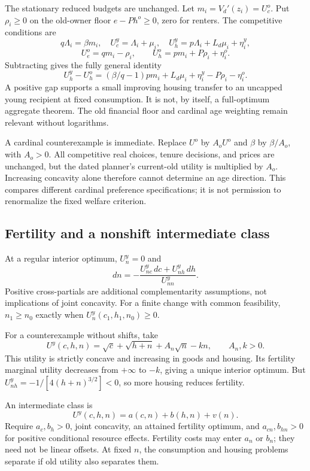 \documentclass[11pt]{article}
\begin{document}
The stationary reduced budgets are unchanged. Let $m_i=V_d'(z_i)=U_c^o$. Put $\rho_i\ge0$ on the old-owner floor $e-Ph^o\ge0$, zero for renters. The competitive conditions are
\[
 q\Lambda_i=\beta m_i,\quad U_c^y=\Lambda_i+\mu_i,\quad
 U_h^y=p\Lambda_i+L_d\mu_i+\eta_i^y,
\]
\[
 U_e^o=qm_i-\rho_i,\qquad U_h^o=pm_i+P\rho_i+\eta_i^o.
\]
Subtracting gives the fully general identity
\begin{equation}
 U_h^y-U_h^o=(\beta/q-1)pm_i+L_d\mu_i+\eta_i^y-P\rho_i-\eta_i^o.\label{eq:generalwedge}
\end{equation}
A positive gap supports a small improving housing transfer to an uncapped young recipient at fixed consumption. It is not, by itself, a full-optimum aggregate theorem. The old financial floor and cardinal age weighting remain relevant without logarithms.

A cardinal counterexample is immediate. Replace $U^o$ by $A_oU^o$ and $\beta$ by $\beta/A_o$, with $A_o>0$. All competitive real choices, tenure decisions, and prices are unchanged, but the dated planner's current-old utility is multiplied by $A_o$. Increasing concavity alone therefore cannot determine an age direction. This compares different cardinal preference specifications; it is not permission to renormalize the fixed welfare criterion.

\subsection{Fertility and a nonshift intermediate class}
At a regular interior optimum, $U_n^y=0$ and
\begin{equation}
 dn=-\frac{U_{nc}^y\,dc+U_{nh}^y\,dh}{U_{nn}^y}.\label{eq:generaln}
\end{equation}
Positive cross-partials are additional complementarity assumptions, not implications of joint concavity. For a finite change with common feasibility, $n_1\ge n_0$ exactly when $U_n^y(c_1,h_1,n_0)\ge0$.

For a counterexample without shifts, take
\[
 U^y(c,h,n)=\sqrt c+\sqrt{h+n}+A_n\sqrt n-kn,\qquad A_n,k>0.
\]
This utility is strictly concave and increasing in goods and housing. Its fertility marginal utility decreases from $+\infty$ to $-k$, giving a unique interior optimum. But $U_{nh}^y=-1/[4(h+n)^{3/2}]<0$, so more housing reduces fertility.

An intermediate class is
\begin{equation}
 U^y(c,h,n)=a(c,n)+b(h,n)+v(n).\label{eq:generalclass}
\end{equation}
Require $a_c,b_h>0$, joint concavity, an attained fertility optimum, and $a_{cn},b_{hn}>0$ for positive conditional resource effects. Fertility costs may enter $a_n$ or $b_n$; they need not be linear offsets. At fixed $n$, the consumption and housing problems separate if old utility also separates them.
\end{document}
